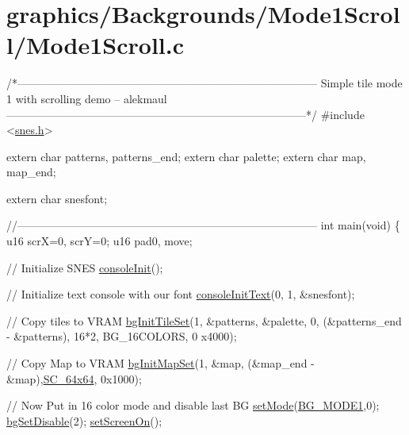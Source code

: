 \hypertarget{a00396}{}\section{graphics/\+Backgrounds/\+Mode1\+Scroll/\+Mode1\+Scroll.\+c}

\begin{DoxyCodeInclude}
\textcolor{comment}{/*---------------------------------------------------------------------------------}
\textcolor{comment}{}
\textcolor{comment}{}
\textcolor{comment}{    Simple tile mode 1 with scrolling demo}
\textcolor{comment}{    -- alekmaul}
\textcolor{comment}{}
\textcolor{comment}{}
\textcolor{comment}{---------------------------------------------------------------------------------*/}
\textcolor{preprocessor}{#include <\hyperlink{a00356}{snes.h}>}

\textcolor{keyword}{extern} \textcolor{keywordtype}{char} patterns, patterns\_end;
\textcolor{keyword}{extern} \textcolor{keywordtype}{char} palette;
\textcolor{keyword}{extern} \textcolor{keywordtype}{char} map, map\_end;

\textcolor{keyword}{extern} \textcolor{keywordtype}{char} snesfont;

\textcolor{comment}{//---------------------------------------------------------------------------------}
\textcolor{keywordtype}{int} main(\textcolor{keywordtype}{void}) \{
    u16 scrX=0, scrY=0;
    u16 pad0, move;

    \textcolor{comment}{// Initialize SNES }
    \hyperlink{a00320_a6047713bb5a73afd3cd1d77e336bcdad}{consoleInit}();
    
    \textcolor{comment}{// Initialize text console with our font}
    \hyperlink{a00320_a458fa049800e12429ca0ba401e513746}{consoleInitText}(0, 1, &snesfont);

    \textcolor{comment}{// Copy tiles to VRAM}
    \hyperlink{a00317_ae09a7ac09be78eef0f28a6c7aabc82ad}{bgInitTileSet}(1, &patterns, &palette, 0, (&patterns\_end - &patterns), 16*2, BG\_16COLORS, 0
      x4000);

    \textcolor{comment}{// Copy Map to VRAM}
    \hyperlink{a00317_acc385296e159449a81d18f5e219c8032}{bgInitMapSet}(1, &map, (&map\_end - &map),\hyperlink{a00317_ace76b0c992e2cba05f6da76f9825720a}{SC\_64x64}, 0x1000);

    \textcolor{comment}{// Now Put in 16 color mode and disable last BG}
    \hyperlink{a00353_afd9e46ae627d055dd8c98a4b0ebb73b1}{setMode}(\hyperlink{a00317_a05c862edb7f8f75036f10c04dcc3c2a6}{BG\_MODE1},0);  \hyperlink{a00317_a4dbfb1b8854ff9ca4a7d11a899281bbb}{bgSetDisable}(2);
    \hyperlink{a00353_abc7d4ef8ebc22f5b710927909bb3f144}{setScreenOn}();
    

\end{DoxyCodeInclude}
